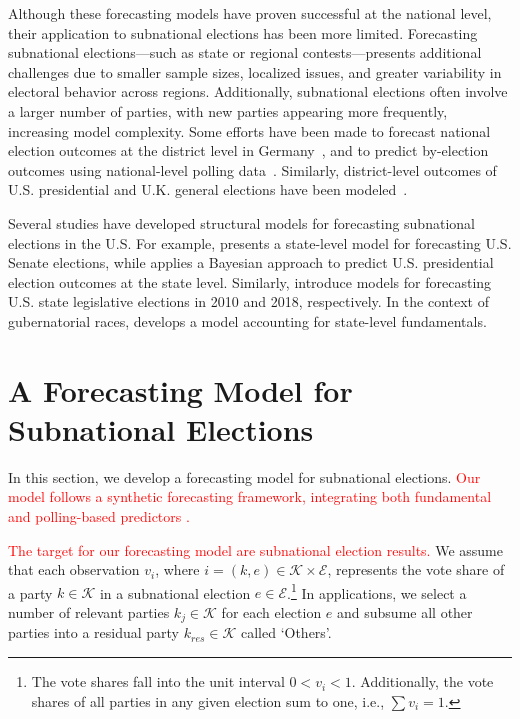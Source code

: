 \documentclass[doublespaced,12pt]{article}
\begin{document}
\begin{doublespacing}
Although these forecasting models have proven successful at the national level, their application to subnational elections has been more limited. Forecasting subnational elections—such as state or regional contests—presents additional challenges due to smaller sample sizes, localized issues, and greater variability in electoral behavior across regions. Additionally, subnational elections often involve a larger number of parties, with new parties appearing more frequently, increasing model complexity.  Some efforts have been made to forecast national election outcomes at the district level in Germany~\citep{munzert2017forecasting, neunhoeffer2020ansatz}, and to predict by-election outcomes using national-level polling data~\citep{hanretty2021forecasting}. Similarly, district-level outcomes of U.S. presidential and U.K. general elections have been modeled~\citep{LAUDERDALE2020399}. 

\color{red}
Several studies have developed structural models for forecasting subnational elections in the U.S. For example, \citet{bardwell2004state} presents a state-level model for forecasting U.S. Senate elections, while \citet{linzer2013dynamic} applies a Bayesian approach to predict U.S. presidential election outcomes at the state level. Similarly, \citet{klarner2010forecasting, klarner20182018} introduce models for forecasting U.S. state legislative elections in 2010 and 2018, respectively. In the context of gubernatorial races, \citet{hummel2014fundamental} develops a model accounting for state-level fundamentals.
\color{black}


\section{A Forecasting Model for Subnational Elections}

In this section, we develop a forecasting model for subnational elections. \textcolor{red}{Our model follows a synthetic forecasting framework, integrating both fundamental and polling-based predictors \citep{Lewis-Beck_Nadeau_Belanger_2016, Lewis-Beck_Dassonneville_2015}.}

 \textcolor{red}{The target for our forecasting model are subnational election results.} We assume that each observation \( v_i \), where $i = (k,e) \in \mathcal{K} \times \mathcal{E}$, represents the vote share of a party $k \in \mathcal{K} $   in a subnational election $e \in \mathcal{E}$.\footnote{The vote shares fall into the unit interval \( 0 < v_i < 1 \). Additionally, the vote shares of all parties in any given election sum to one, i.e., $\sum v_i = 1$.} In applications, we select a number of relevant parties $k_j \in \mathcal{K}$ for each election $e$ and subsume all other parties into a residual party $k_{res} \in \mathcal{K}$ called `Others'.


\end{doublespacing}
\end{document}

